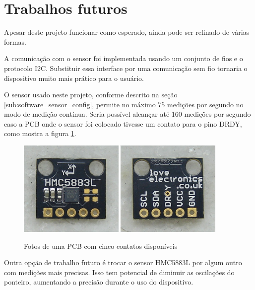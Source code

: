 \documentclass[brazil,pagestart=firstchapter]{abnt}
\begin{document}
\section{Trabalhos futuros}
\label{sec:trabalhos_futuros}

Apesar deste projeto funcionar como esperado, ainda pode ser refinado de
várias formas.

A comunicação com o sensor foi implementada usando um conjunto de fios e o
protocolo \ac{I2C}. Substituir essa interface por uma comunicação sem fio
tornaria o dispositivo muito mais prático para o usuário.

O sensor usado neste projeto, conforme descrito na seção
\ref{sub:software_sensor_config}, permite no máximo 75 medições por segundo
no modo de medição contínua. Seria possível alcançar até 160 medições por
segundo caso a \ac{PCB} onde o sensor foi colocado tivesse um contato para o
pino DRDY, como mostra a figura \ref{fig:loveelectronics_photos}.

\begin{figure}[h]
\centering
\includegraphics[width=0.45\textwidth]{img/sensor_other_pcb_front.jpg}
\includegraphics[width=0.45\textwidth]{img/sensor_other_pcb_back.jpg}
\caption{Fotos de uma PCB com cinco contatos disponíveis}
\label{fig:loveelectronics_photos}
\end{figure}

Outra opção de trabalho futuro é trocar o sensor HMC5883L por algum outro
com medições mais precisas. Isso tem potencial de diminuir as oscilações do
ponteiro, aumentando a precisão durante o uso do dispositivo.
\end{document}
